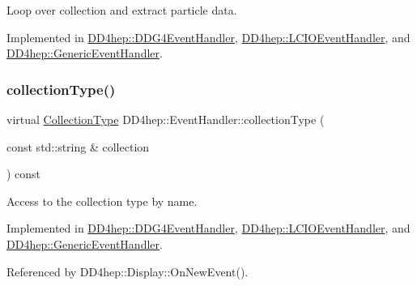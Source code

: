 Loop over collection and extract particle data. 



Implemented in \hyperlink{class_d_d4hep_1_1_d_d_g4_event_handler_a9f45863ae9406f8d5ec1d309321c50d6}{D\+D4hep\+::\+D\+D\+G4\+Event\+Handler}, \hyperlink{class_d_d4hep_1_1_l_c_i_o_event_handler_aa741ce2b60b3eddd4ddeb1fba6197a86}{D\+D4hep\+::\+L\+C\+I\+O\+Event\+Handler}, and \hyperlink{class_d_d4hep_1_1_generic_event_handler_aa733b6de00ba09d05b2c4e33b0cd3232}{D\+D4hep\+::\+Generic\+Event\+Handler}.

\hypertarget{class_d_d4hep_1_1_event_handler_a8424ffc2056b0e23d69c81ab2496cd51}{}\label{class_d_d4hep_1_1_event_handler_a8424ffc2056b0e23d69c81ab2496cd51} 
\subsubsection{\texorpdfstring{collection\+Type()}{collectionType()}}
{\footnotesize\ttfamily virtual \hyperlink{class_d_d4hep_1_1_event_handler_a0b22a141a019364495835317fad48254}{Collection\+Type} D\+D4hep\+::\+Event\+Handler\+::collection\+Type (\begin{DoxyParamCaption}\item[{const std\+::string \&}]{collection }\end{DoxyParamCaption}) const\hspace{0.3cm}{\ttfamily [pure virtual]}}



Access to the collection type by name. 



Implemented in \hyperlink{class_d_d4hep_1_1_d_d_g4_event_handler_acc51cf7d3b3b338c6f5ae1f75582f708}{D\+D4hep\+::\+D\+D\+G4\+Event\+Handler}, \hyperlink{class_d_d4hep_1_1_l_c_i_o_event_handler_a7c3518a706040840f32c6f1323b2b8ca}{D\+D4hep\+::\+L\+C\+I\+O\+Event\+Handler}, and \hyperlink{class_d_d4hep_1_1_generic_event_handler_aeb30b8fc7e8e850fa7472fc70443b817}{D\+D4hep\+::\+Generic\+Event\+Handler}.



Referenced by D\+D4hep\+::\+Display\+::\+On\+New\+Event().

\hypertarget{class_d_d4hep_1_1_event_handler_a263d136331d72994bcbf537d4aa16d4f}{}\label{class_d_d4hep_1_1_event_handler_a263d136331d72994bcbf537d4aa16d4f} 
